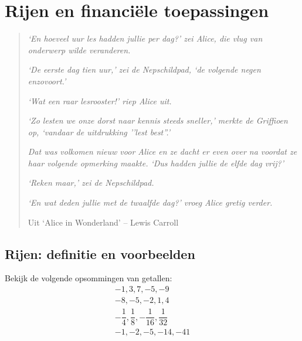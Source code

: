 %
%
%
%
%           
%




\newsavebox{\boog}
\setlength{\unitlength}{1mm}

\chapter{Rijen en financi\"{e}le toepassingen}\label{chap:rijen}

\begin{quote}
     \textit{{\small `En hoeveel uur les hadden jullie per dag?' zei
     Alice, die vlug van onderwerp wilde veranderen.}}

     \textit{{\small `De eerste dag tien uur,' zei de Nepschildpad,
     `de volgende negen enzovoort.'}}

     \textit{{\small `Wat een raar lesrooster!' riep Alice uit.}}

     \textit{{\small `Zo lesten we onze dorst naar kennis steeds
     sneller,' merkte de Griffioen op, `vandaar de uitdrukking ''lest
     best''.'}}

     \textit{{\small Dat was volkomen nieuw voor Alice en ze dacht er
     even over na voordat ze haar volgende opmerking maakte. `Dus
     hadden jullie de elfde dag vrij?'}}

     \textit{{\small `Reken maar,' zei de Nepschildpad.}}

     \textit{{\small `En wat deden jullie met de twaalfde dag?' vroeg
     Alice gretig verder.}}

          Uit `Alice in Wonderland' -- Lewis Carroll
\end{quote}



\newpage
\section{Rijen: definitie en voorbeelden}

Bekijk de volgende opsommingen van getallen:
\begin{eqnarray}
     & -1 ,3 , 7, -5 , -9&
    \label{eq:voorb1}  \\
     & -8,-5,-2,1,4 &
    \label{eq:voorb2} \label{vb2}  \\
     & -\dfrac{1}{4},\dfrac{1}{8},-\dfrac{1}{16},\dfrac{1}{32} &
    \label{eq:voorb3}  \\
     & -1,-2,-5,-14,-41&
    \label{eq:voorb4}
\end{eqnarray}

